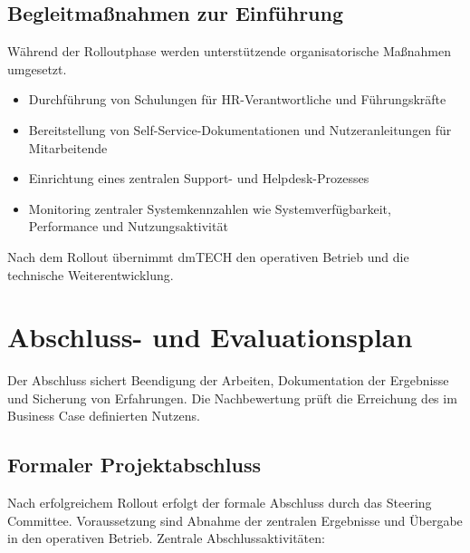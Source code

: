 \subsection{Begleitmaßnahmen zur Einführung}

Während der Rolloutphase werden unterstützende organisatorische Maßnahmen umgesetzt.

\begin{itemize}

    \item Durchführung von Schulungen für \ac{HR}-Verantwortliche und
          Führungskräfte

    \item Bereitstellung von Self-Service-Dokumentationen und
          Nutzeranleitungen für Mitarbeitende

    \item Einrichtung eines zentralen Support- und Helpdesk-Prozesses

    \item Monitoring zentraler Systemkennzahlen wie Systemverfügbarkeit,
          Performance und Nutzungsaktivität

\end{itemize}

Nach dem Rollout übernimmt \acs{dmTECH} den operativen Betrieb und die technische Weiterentwicklung.



\section{Abschluss- und Evaluationsplan}

Der Abschluss sichert Beendigung der Arbeiten, Dokumentation der Ergebnisse und Sicherung von Erfahrungen. Die Nachbewertung prüft die Erreichung des im Business Case definierten Nutzens.

\subsection{Formaler Projektabschluss}

Nach erfolgreichem Rollout erfolgt der formale Abschluss durch das Steering Committee. Voraussetzung sind Abnahme der zentralen Ergebnisse und Übergabe in den operativen Betrieb. Zentrale Abschlussaktivitäten:

